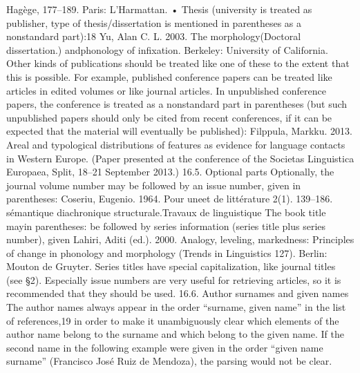 Hagège, 177–189. Paris: L’Harmattan.
• Thesis (university is treated as publisher, type of thesis/dissertation is mentioned in
parentheses as a nonstandard part):18
Yu, Alan C. L. 2003. The morphology(Doctoral dissertation.)
andphonology of infixation. Berkeley: University of California.
Other kinds of publications should be treated like one of these to the extent that this is
possible. For example, published conference papers can be treated like articles in edited
volumes or like journal articles. In unpublished conference papers, the conference is treated
as a nonstandard part in parentheses (but such unpublished papers should only be cited
from recent conferences, if it can be expected that the material will eventually be
published):
Filppula, Markku. 2013. Areal and typological distributions of features as evidence for language
contacts in Western Europe. (Paper presented at the conference of the Societas Linguistica
Europaea, Split, 18–21 September 2013.)
16.5. Optional parts
Optionally, the journal volume number may be followed by an issue number, given in
parentheses:
Coseriu, Eugenio. 1964. Pour uneet de littérature 2(1). 139–186.
sémantique diachronique structurale.Travaux de linguistique
The book title mayin parentheses:
be followed by series information (series title plus series number), given
Lahiri, Aditi (ed.). 2000. Analogy, leveling, markedness: Principles of change in phonology and
morphology (Trends in Linguistics 127). Berlin: Mouton de Gruyter.
Series titles have special capitalization, like journal titles (see §2).
Especially issue numbers are very useful for retrieving articles, so it is recommended that
they should be used.
16.6. Author surnames and given names
The author names always appear in the order “surname, given name” in the list of
references,19 in order to make it unambiguously clear which elements of the author name
belong to the surname and which belong to the given name. If the second name in the
following example were given in the order “given name surname” (Francisco José Ruiz de
Mendoza), the parsing would not be clear.
	
 	
 	
 	
 	
 	
 	
 	
 	
 	
 	
 	
 	
 	
 	
 	
 	
 	
 	
 	
 	
 	
 	

